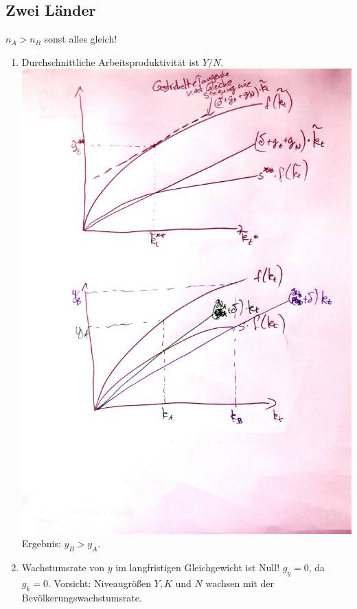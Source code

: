 \documentclass{scrartcl}
\begin{document}
\subsection{Zwei L\"{a}nder}
$n_A>n_B$ sonst alles gleich!
\begin{enumerate}
  \item Durchschnittliche Arbeitsproduktivit\"{a}t ist $Y/N$.\\ 
  \includegraphics[width=\textwidth,keepaspectratio]{Bilder/Solow2Laender.pdf}
  Ergebnis: $y_B > y_A$.
  \item Wachstumsrate von $y$ im langfristigen Gleichgewicht ist Null! $g_y=0$, da $g_k=0$. Vorsicht: Niveaugr\"{o}{\ss}en $Y, K$ und $N$ wachsen mit der Bev\"{o}lkerungswachstumsrate.
\end{enumerate}
\end{document}
